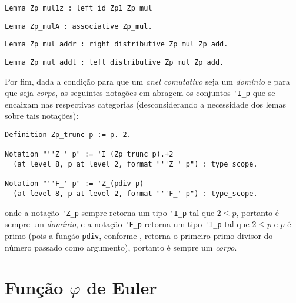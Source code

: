     \begin{lstlisting}[language=coq,frame=single,tabsize=1]
Lemma Zp_mul1z : left_id Zp1 Zp_mul
    \end{lstlisting}
    \begin{lstlisting}[language=coq,frame=single,tabsize=1]
Lemma Zp_mulA : associative Zp_mul.
    \end{lstlisting}
    \begin{lstlisting}[language=coq,frame=single,tabsize=1]
Lemma Zp_mul_addr : right_distributive Zp_mul Zp_add.
    \end{lstlisting}
    \begin{lstlisting}[language=coq,frame=single,tabsize=1]
Lemma Zp_mul_addl : left_distributive Zp_mul Zp_add.
    \end{lstlisting}

Por fim, dada a condição para que um \textit{anel comutativo} seja um \textit{domínio} e para que seja \textit{corpo}, as seguintes notações em \cite{mathcomp-zmodp} abragem os conjuntos \lstinline[language=coq]|'I_p| que se encaixam nas respectivas categorias (desconsiderando a necessidade dos lemas sobre tais notações):
    \begin{lstlisting}[language=coq,frame=single,tabsize=1]
Definition Zp_trunc p := p.-2.

Notation "''Z_' p" := 'I_(Zp_trunc p).+2
  (at level 8, p at level 2, format "''Z_' p") : type_scope.
  
Notation "''F_' p" := 'Z_(pdiv p)
  (at level 8, p at level 2, format "''F_' p") : type_scope.
    \end{lstlisting}
onde a notação \lstinline[language=coq]|'Z_p| sempre retorna um tipo \lstinline[language=coq]|'I_p| tal que $2 \leq p$, portanto é sempre um \textit{domínio}, e a notação \lstinline[language=coq]|'F_p| retorna um tipo \lstinline[language=coq]|'I_p| tal que $2 \leq p$ e $p$ é primo (pois a função \lstinline[language=coq]|pdiv|, conforme \cite{mathcomp-prime}, retorna o primeiro primo divisor do número passado como argumento), portanto é sempre um \textit{corpo}.


\section{Função $\varphi$ de Euler}

